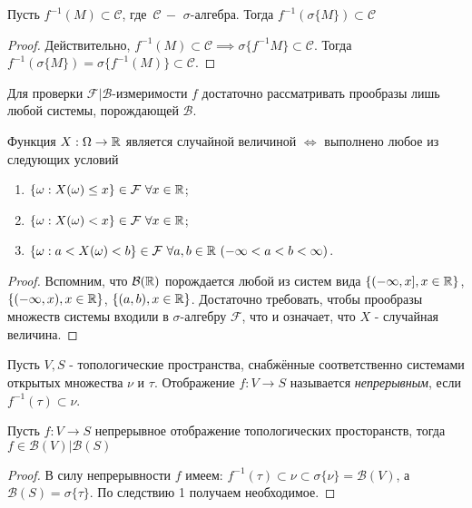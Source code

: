 \begin{col}\label{lect05:col1}
	Пусть $f^{-1}(M) \subset \mathcal{C}$, где $\, \mathcal{C} \,- $ $\sigma$-алгебра. Тогда $f^{-1}(\sigma\{M\}) \subset \mathcal{C}$
\end{col}
\begin{proof}
	Действительно, $f^{-1}(M) \subset \mathcal{C} \implies \sigma\{f^{-1}M\} \subset \mathcal{C}$. Тогда $f^{-1}(\sigma\{M\}) = \sigma\{f^{-1}(M)\} \subset \mathcal{C}$.
\end{proof}
Для проверки $\mathcal{F}|\mathcal{B}$-измеримости $f$ достаточно рассматривать прообразы лишь любой системы, порождающей $\mathcal{B}$.
\begin{col}\label{lect05:col2}
	Функция $X: \Omega \to \mathbb{R}$ является случайной величиной $\iff$ выполнено любое из следующих условий
	\begin{enumerate}
		\item $\{\omega: X(\omega) \leq x\} \in \mathcal{F} \,\, \forall x \in \mathbb{R}$;
		\item $\{\omega: X(\omega) < x\} \in \mathcal{F} \,\, \forall x \in \mathbb{R}$;
		\item $\{\omega: a<X(\omega) <b\} \in \mathcal{F} \,\, \forall a, b  \in \mathbb{R} \,\, (-\infty<a<b<\infty)$.
	\end{enumerate}
\end{col}
\begin{proof}
	Вспомним, что $\mathcal{B}(\mathbb{R})$ порождается любой из систем вида $\{ (-\infty, x],  x \in \mathbb{R}\}$, $\{ (-\infty, x),  x \in \mathbb{R}\}$, $\{ (a, b),  x \in \mathbb{R}\}$. Достаточно требовать, чтобы прообразы множеств системы входили в $\sigma$-алгебру $\mathcal{F}$, что и означает, что $X$ - случайная величина.
\end{proof}
\begin{definition}\label{lect05:def2}
	Пусть $V, S$ - топологические пространства, снабжённые соответственно системами открытых множества $\nu$ и $\tau$. Отображение $f: V \to S$ называется \textit{непрерывным}, если $f^{-1}(\tau) \subset \nu$.
\end{definition}
\begin{prop}\label{lect05:prop1}
	Пусть $f: V \to S$ непрерывное отображение топологических просторанств, тогда $f \in \mathcal{B}(V)| \mathcal{B}(S)$
\end{prop}
\begin{proof}
	В силу непрерывности $f$ имеем: $f^{-1}(\tau) \subset \nu \subset \sigma\{\nu\} = \mathcal{B}(V)$, а $\mathcal{B}(S) = \sigma \{\tau\}$. По следствию 1 получаем  необходимое.
\end{proof}
